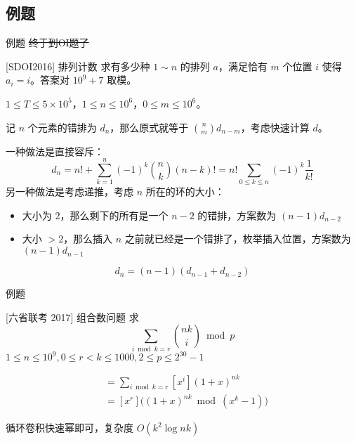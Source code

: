 \documentclass[UTF8]{beamer}
\begin{document}
    \subsection{例题}
    \begin{frame}{例题}
        \sout{终于到OI题了}

        \begin{block}{[SDOI2016] 排列计数}
        求有多少种 $1\sim n$ 的排列 $a$，满足恰有 $m$ 个位置 $i$ 使得 $a_i = i$。答案对 $10^9 + 7$ 取模。

        $1 \leq T \leq 5 \times 10^5$，$1 \leq n \leq 10^6$，$0 \leq m \leq 10^6$。
        \end{block}
        \pause
        记 $n$ 个元素的错排为 $d_n$，那么原式就等于 $\binom nm d_{n-m}$，考虑快速计算 $d$。
    \end{frame}
    \begin{frame}
        
        一种做法是直接容斥：
        $$d_n=n!+\sum_{k=1}^n(-1)^k\binom{n}{k}(n-k)!=n!\sum_{0\leq k\leq n}(-1)^k\frac 1{k!}$$
        \pause
        另一种做法是考虑递推，考虑 $n$ 所在的环的大小：
        \begin{itemize}
            \item 大小为 $2$，那么剩下的所有是一个 $n-2$ 的错排，方案数为 $(n-1)d_{n-2}$
            \item 大小 $>2$，那么插入 $n$ 之前就已经是一个错排了，枚举插入位置，方案数为 $(n-1)d_{n-1}$
        \end{itemize}
        $$d_n=(n-1)(d_{n-1}+d_{n-2})$$
    \end{frame}

    \begin{frame}{例题}
        \begin{block}{[六省联考 2017] 组合数问题}
            求
            $$
            \sum_{i\bmod k=r}\binom{nk}{i}\bmod p
            $$
            $1\le n\le 10^9,0\le r<k\le 1000, 2\le p\le 2^{30}-1$
        \end{block}
        \pause
        $$
        \begin{aligned}
        &=\sum_{i\bmod k=r}[x^i](1+x)^{nk}\\
        &=[x^r]\Big((1+x)^{nk}\bmod (x^k-1)\Big)
        \end{aligned}
        $$

        循环卷积快速幂即可，复杂度 $O(k^2\log nk)$
    \end{frame}

\end{document}

